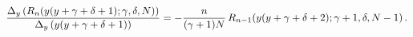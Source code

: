 \[\frac{\Delta_{y}\left(\mathop{R_{n}\/}\nolimits\!\left(y(y+\gamma+\delta+1);%
\gamma,\delta,N\right)\right)}{\Delta_{y}\left(y(y+\gamma+\delta+1)\right)}=-%
\frac{n}{(\gamma+1)N}\*\mathop{R_{n-1}\/}\nolimits\!\left(y(y+\gamma+\delta+2)%
;\gamma+1,\delta,N-1\right).\]